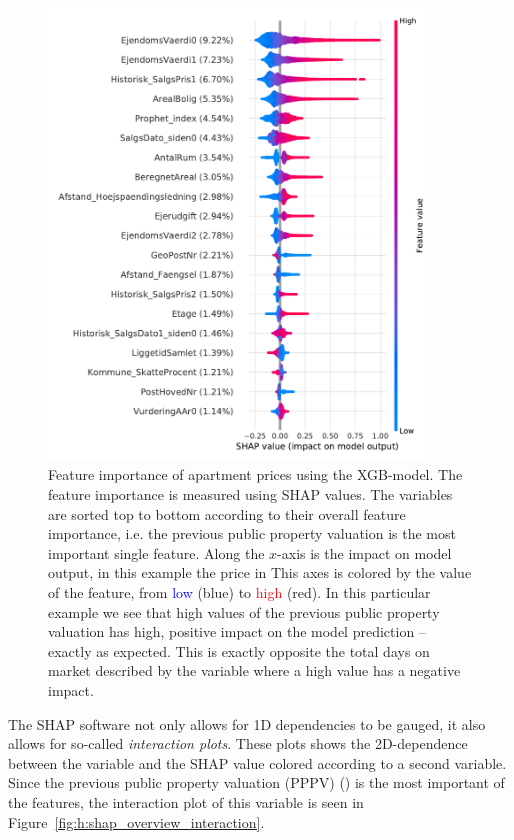 \begin{figure}[ht!]
  \centerfloat
  \includegraphics[width=0.9\textwidth, trim=0 0 0 1, clip]{figures/housing/Ejerlejlighed_v19_cut_all_Ncols_all_xgb_tight_SHAP_vals_summary.pdf}
  \caption[Feature importance of Apartments Prices]
          {Feature importance of apartment prices using the XGB-model. The feature importance is measured using SHAP values. The variables are sorted top to bottom according to their overall feature importance, i.e. the previous public property valuation  is the most important single feature. Along the $x$-axis is the impact on model output, in this example the price in \si{\Mkr} This axes is colored by the value of the feature, from \textcolor{blue}{low} (blue) to \textcolor{red}{high} (red). In this particular example we see that high values of the previous public property valuation has high, positive impact on the model prediction -- exactly as expected. This is exactly opposite the total days on market described by the variable  where a high value has a negative impact.  
          } 
  \label{fig:h:shap_overview}
\end{figure}

The SHAP software \citep{lundbergConsistentIndividualizedFeature2018} not only allows for 1D dependencies to be gauged, it also allows for so-called \emph{interaction plots}. These plots shows the 2D-dependence between the variable and the SHAP value colored according to a second variable. Since the previous public property valuation (PPPV) () is the most important of the features, the interaction plot of this variable is seen in Figure~\ref{fig:h:shap_overview_interaction}. 

